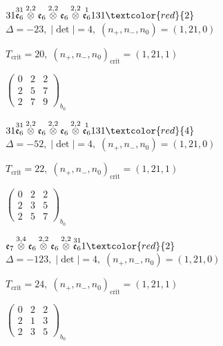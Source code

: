 \documentclass[10pt]{article}
\begin{document}
$31\overset{31}{\mathfrak{e}_6}\overset{2,2}{\otimes}\mathfrak{e}_6\overset{2,2}{\otimes}\mathfrak{e}_6\overset{2,2}{\otimes}\overset{1}{\mathfrak{e}_6}131\textcolor{red}{2}$ \quad $\Delta=-23,\; |\det|=4,\; (n_+,n_-,n_0)=(1,21,0)$

\hspace{1em}$T_{\text{crit}}=20,\; (n_+,n_-,n_0)_{\text{crit}}=(1,21,1)$

\hspace{2em}$\left(\begin{smallmatrix}0 & 2 & 2 \\ 2 & 5 & 7 \\ 2 & 7 & 9\end{smallmatrix}\right)_{\!b_0}$

$31\overset{31}{\mathfrak{e}_6}\overset{2,2}{\otimes}\mathfrak{e}_6\overset{2,2}{\otimes}\mathfrak{e}_6\overset{2,2}{\otimes}\overset{1}{\mathfrak{e}_6}131\textcolor{red}{4}$ \quad $\Delta=-52,\; |\det|=4,\; (n_+,n_-,n_0)=(1,21,0)$

\hspace{1em}$T_{\text{crit}}=22,\; (n_+,n_-,n_0)_{\text{crit}}=(1,21,1)$

\hspace{2em}$\left(\begin{smallmatrix}0 & 2 & 2 \\ 2 & 3 & 5 \\ 2 & 5 & 7\end{smallmatrix}\right)_{\!b_0}$

\smallskip

$\mathfrak{e}_7\overset{3,4}{\otimes}\mathfrak{e}_6\overset{2,2}{\otimes}\mathfrak{e}_6\overset{2,2}{\otimes}\overset{31}{\mathfrak{e}_6}1\textcolor{red}{2}$ \quad $\Delta=-123,\; |\det|=4,\; (n_+,n_-,n_0)=(1,21,0)$

\hspace{1em}$T_{\text{crit}}=24,\; (n_+,n_-,n_0)_{\text{crit}}=(1,21,1)$

\hspace{2em}$\left(\begin{smallmatrix}0 & 2 & 2 \\ 2 & 1 & 3 \\ 2 & 3 & 5\end{smallmatrix}\right)_{\!b_0}$

\smallskip
\end{document}
